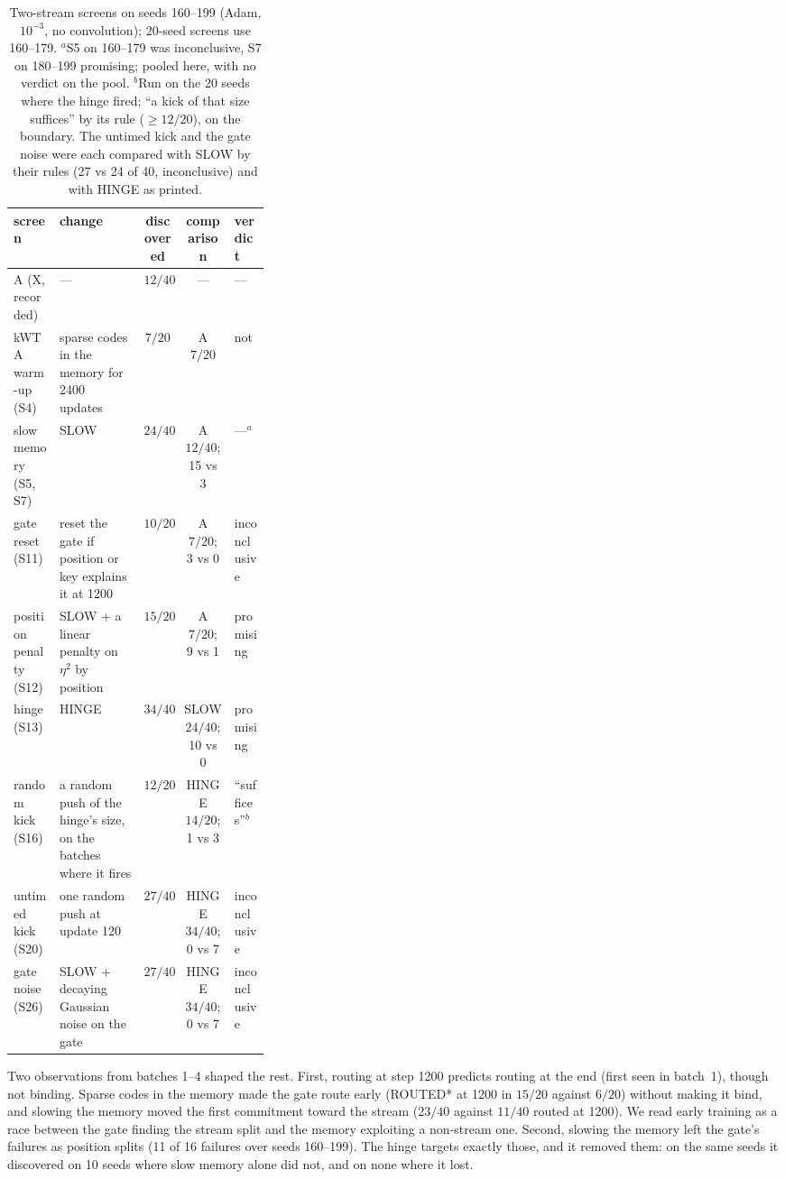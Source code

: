 \documentclass[11pt]{article}
\newcommand{\arm}[1]{\textsf{#1}}
\begin{document}
\begin{table}[h]
\centering
\footnotesize
\setlength{\tabcolsep}{4pt}
\begin{tabular}{@{}l>{\raggedright\arraybackslash}p{0.33\linewidth}ccl@{}}
\toprule
screen & change & discovered & comparison & verdict\\
\midrule
\arm{A} (X, recorded) & --- & $12/40$ & --- & ---\\
kWTA warm-up (S4) & sparse codes in the memory for 2400 updates & $7/20$ & \arm{A} $7/20$ & not\\
slow memory (S5, S7) & SLOW & $24/40$ & \arm{A} $12/40$; 15 vs 3 & ---$^{a}$\\
gate reset (S11) & reset the gate if position or key explains it at 1200 & $10/20$ & \arm{A} $7/20$; 3 vs 0 & inconclusive\\
position penalty (S12) & SLOW + a linear penalty on $\eta^2$ by position & $15/20$ & \arm{A} $7/20$; 9 vs 1 & promising\\
hinge (S13) & HINGE & $34/40$ & SLOW $24/40$; 10 vs 0 & promising\\
random kick (S16) & a random push of the hinge's size, on the batches where it fires & $12/20$ & HINGE $14/20$; 1 vs 3 & ``suffices''$^{b}$\\
untimed kick (S20) & one random push at update 120 & $27/40$ & HINGE $34/40$; 0 vs 7 & inconclusive\\
gate noise (S26) & SLOW + decaying Gaussian noise on the gate & $27/40$ & HINGE $34/40$; 0 vs 7 & inconclusive\\
\bottomrule
\end{tabular}
\caption{Two-stream screens on seeds 160--199 (Adam, $10^{-3}$, no convolution); 20-seed screens use 160--179. $^{a}$S5 on 160--179 was inconclusive, S7 on 180--199 promising; pooled here, with no verdict on the pool. $^{b}$Run on the 20 seeds where the hinge fired; ``a kick of that size suffices'' by its rule ($\geq 12/20$), on the boundary. The untimed kick and the gate noise were each compared with SLOW by their rules (27 vs 24 of 40, inconclusive) and with HINGE as printed.}
\label{tab:screens}
\end{table}

\noindent
Two observations from batches 1--4 shaped the rest. First, routing at step 1200 predicts routing at the end (first seen in batch~1), though not binding. Sparse codes in the memory made the gate route early (ROUTED* at 1200 in $15/20$ against $6/20$) without making it bind, and slowing the memory moved the first commitment toward the stream ($23/40$ against $11/40$ routed at 1200). We read early training as a race between the gate finding the stream split and the memory exploiting a non-stream one. Second, slowing the memory left the gate's failures as position splits (11 of 16 failures over seeds 160--199). The hinge targets exactly those, and it removed them: on the same seeds it discovered on 10 seeds where slow memory alone did not, and on none where it lost.
\end{document}
